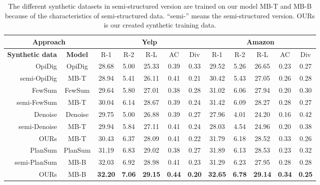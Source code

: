 \begin{table*}[th]
	\begin{center}
		\small
		\begin{tabular}{|r|c|c|c|c|c|c|c|c|c|c|c|}
			\hline
			\multicolumn{2}{|c|}{\bf Approach} & \multicolumn{5}{c|}{\bf Yelp} &  \multicolumn{5}{c|}{\bf Amazon} \\
			\hline
			\textbf{Synthetic data} & \textbf{Model} & R-1 & R-2 & R-L & AC & Div & R-1 & R-2 & R-L & AC & Div \\
			\hline
			OpiDig & OpiDig & 28.68 &5.00 & 25.33& 0.39 & 0.33 & 29.52 & 5.26 & 26.65 & 0.23 & 0.27 \\
			semi-OpiDig& MB-T & 28.94 & 5.41 & 26.11 & 0.41 & 0.21 &30.42 & 5.43& 27.05 & 0.26 & 0.28\\
			\hline
			FewSum & FewSum & 29.64 & 5.80 & 27.01 & 0.38 & 0.28 & 31.02 & 6.06 & 27.94 & 0.20 & 0.30 \\
			semi-FewSum & MB-T & 30.04 & 6.14 & 28.67 & 0.39 & 0.24 &31.42 & 6.09& 28.27 & 0.28 & 0.27\\
			\cline{1-12}	 
			Denoise & Denoise& 29.75 & 5.00 & 26.88 & 0.39 & 0.27 &27.96 & 4.01 & 24.20& 0.16 & 0.42  \\
			semi-Denoise & MB-T & 29.94 & 5.84& 27.11 & 0.41 & 0.24 & 28.03& 4.54& 24.96 & 0.20 & 0.38 \\
			\cline{1-12}	 
						OURs & MB-T & 30.43 & 6.37 & 28.09 & 0.41 & 0.22 & 31.79 & 6.18 & 28.52 & 0.33 & 0.26 \\ 
						\hline
			PlanSum & PlanSum & 31.19&6.83 &29.02 &0.38 & 0.27 & 31.89 &6.13 & 28.53 & 0.23 & 0.32\\  %
			semi-PlanSum& MB-B & 32.03& 6.92 & 28.98 & 0.41 & 0.23 & 31.29 & 6.23 &  27.95& 0.28 & 0.28 \\
			\hline
			OURs& MB-B & \bf 32.20 & \bf 7.06 & \bf 29.15 & \bf 0.44 & \bf 0.20 & \bf 32.65 & \bf 6.78 & \bf 29.14 & \bf 0.34 & \bf 0.25 \\ 
			\hline
		\end{tabular}
	\end{center}
	\caption{The different synthetic datasets in semi-structured version
		are trained on our model MB-T and MB-B because of the characteristics of semi-structured data. ``semi-'' means the semi-structured version. OURs is our created synthetic training data.}
	\label{tab:traindata}  
\end{table*}

